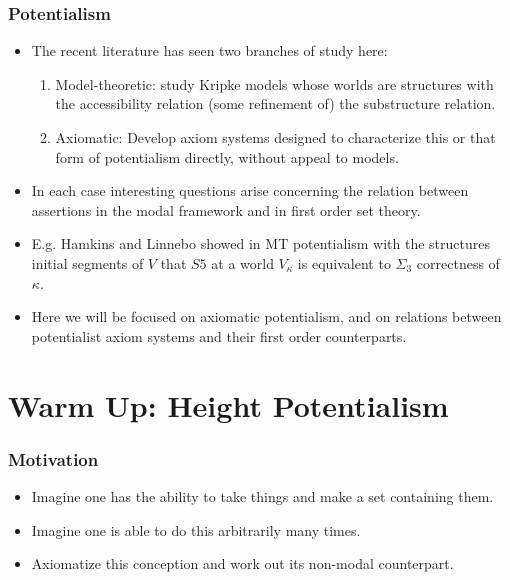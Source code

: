 \documentclass[handout]{beamer}
\begin{document}
\begin{frame}
\frametitle{Potentialism}
    \begin{itemize}
        \item The recent literature has seen two branches of study here:
        \begin{enumerate}
            \item<2->   Model-theoretic: study Kripke models whose worlds are 
                        structures with the accessibility relation (some refinement of)
                        the substructure relation.
            \item<3->   Axiomatic: Develop axiom systems designed to characterize 
                        this or that form of potentialism directly, without appeal to models.
        \end{enumerate}
        \item<4->   In each case interesting questions arise concerning the relation 
                    between assertions in the modal framework and in first order set theory.
        \item<5->   E.g. Hamkins and Linnebo showed in MT potentialism with the structures
                    initial segments of $V$ that $S5$ at a world $V_\kappa$ is equivalent 
                    to $\Sigma_3$ correctness of $\kappa$.
        \item<6->   Here we will be focused on axiomatic potentialism, and on 
                    relations between potentialist axiom systems and their first order counterparts.
    \end{itemize}
    
\end{frame}

\section{Warm Up: Height Potentialism}

\begin{frame}
    \frametitle{Motivation}
    \begin{itemize}
        \item<2->   Imagine one has the ability to take things and 
                    make a set containing them.
        \item<3->   Imagine one is able to do this arbitrarily many times.
        \item<4->   Axiomatize this conception and work out its non-modal counterpart.
    \end{itemize}
\end{frame}
\end{document}
